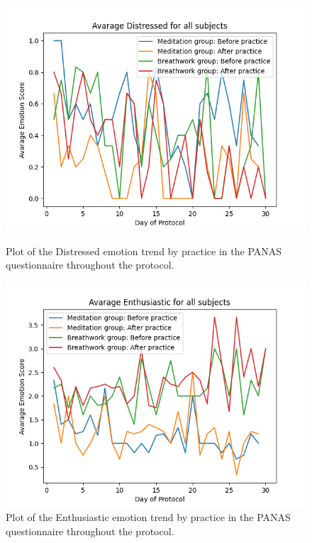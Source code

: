 \begin{figure}
    \centering
    \begin{minipage}{0.49\linewidth}
        \includegraphics[width=\linewidth]{Figures/panas/emotions/Distressed.png}
        \caption{Plot of the Distressed emotion trend by practice in the PANAS questionnaire throughout the protocol.}
        \label{fig:distressed_by_practice}
    \end{minipage}
    \hfill %
    \begin{minipage}{0.49\linewidth}
        \includegraphics[width=\linewidth]{Figures/panas/emotions/Enthusiastic.png}
        \caption{Plot of the Enthusiastic emotion trend by practice in the PANAS questionnaire throughout the protocol.}
        \label{fig:enthusiastic_by_practice}
    \end{minipage}
\end{figure} %

